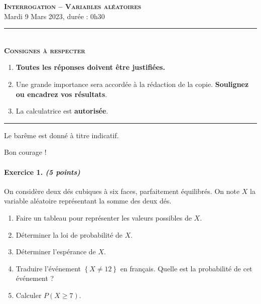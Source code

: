 \documentclass[11pt]{article}
\begin{document}

%
%
%

\begin{center}
\textbf{\LARGE \textsc{Interrogation -- Variables aléatoires}}\\[2mm]

{\large Mardi 9 Mars 2023, durée : 0h30}\\[1mm]
\noindent\rule{8cm}{0.4pt}\\[1mm]
\textbf{\textsc{Consignes à respecter}}
\begin{enumerate}[label=\textbf{\arabic*/}]
\item \textbf{Toutes les réponses doivent être justifiées.}
\item Une grande importance sera accordée à la rédaction de la
  copie. \textbf{Soulignez ou encadrez vos résultats}.
\item La calculatrice est \textbf{autorisée}.
    \end{enumerate}
\noindent\rule{12cm}{0.4pt}
\end{center}

\vspace{2mm}
\noindent Le barême est donné à titre indicatif.
\vspace{2mm}
\begin{center}
  Bon courage !
\end{center}

\paragraph{Exercice 1. \emph{(5 points)}} On considère deux dés cubiques à six
faces, parfaitement équilibrés. On note $X$ la variable aléatoire
représentant la somme des deux dés.
\begin{enumerate}
  \item Faire un tableau pour représenter les valeurs possibles de $X$.
  \item Déterminer la loi de probabilité de $X$.
  \item Déterminer l'espérance de $X$.
  \item Traduire l'événement $\left\{ X\neq 12 \right\}$ en français. Quelle est la
    probabilité de cet événement ?
  \item Calculer $P\left( X\geq 7 \right)$.
\end{enumerate}
\end{document}
